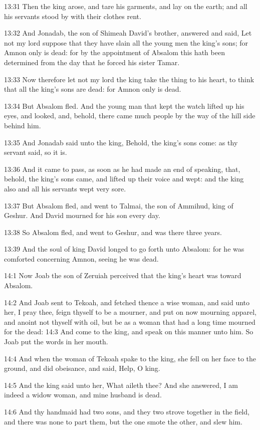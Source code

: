 13:31 Then the king arose, and tare his garments, and lay on the
earth; and all his servants stood by with their clothes rent.

13:32 And Jonadab, the son of Shimeah David's brother, answered and
said, Let not my lord suppose that they have slain all the young men
the king's sons; for Amnon only is dead: for by the appointment of
Absalom this hath been determined from the day that he forced his
sister Tamar.

13:33 Now therefore let not my lord the king take the thing to his
heart, to think that all the king's sons are dead: for Amnon only is
dead.

13:34 But Absalom fled. And the young man that kept the watch lifted
up his eyes, and looked, and, behold, there came much people by the
way of the hill side behind him.

13:35 And Jonadab said unto the king, Behold, the king's sons come: as
thy servant said, so it is.

13:36 And it came to pass, as soon as he had made an end of speaking,
that, behold, the king's sons came, and lifted up their voice and
wept: and the king also and all his servants wept very sore.

13:37 But Absalom fled, and went to Talmai, the son of Ammihud, king
of Geshur. And David mourned for his son every day.

13:38 So Absalom fled, and went to Geshur, and was there three years.

13:39 And the soul of king David longed to go forth unto Absalom: for
he was comforted concerning Amnon, seeing he was dead.

14:1 Now Joab the son of Zeruiah perceived that the king's heart was
toward Absalom.

14:2 And Joab sent to Tekoah, and fetched thence a wise woman, and
said unto her, I pray thee, feign thyself to be a mourner, and put on
now mourning apparel, and anoint not thyself with oil, but be as a
woman that had a long time mourned for the dead: 14:3 And come to the
king, and speak on this manner unto him. So Joab put the words in her
mouth.

14:4 And when the woman of Tekoah spake to the king, she fell on her
face to the ground, and did obeisance, and said, Help, O king.

14:5 And the king said unto her, What aileth thee? And she answered, I
am indeed a widow woman, and mine husband is dead.

14:6 And thy handmaid had two sons, and they two strove together in
the field, and there was none to part them, but the one smote the
other, and slew him.

